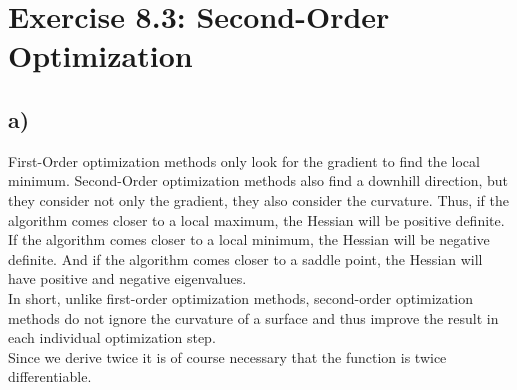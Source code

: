 \documentclass[a4paper]{article}
\begin{document}
\newpage
\section*{Exercise 8.3: Second-Order Optimization}
    \subsection*{a)}
        First-Order optimization methods only look for the gradient to find the local minimum.
        Second-Order optimization methods also find a downhill direction, but they consider not only the gradient, they also consider the curvature.
        Thus, if the algorithm comes closer to a local maximum, the Hessian will be positive definite.
        If the algorithm comes closer to a local minimum, the Hessian will be negative definite.
        And if the algorithm comes closer to a saddle point, the Hessian will have positive and negative eigenvalues.\\
        In short, unlike first-order optimization methods, second-order optimization methods do not ignore the curvature of a surface and thus improve the result in each individual optimization step.\\
        
        Since we derive twice it is of course necessary that the function is twice differentiable.
        
\end{document}
